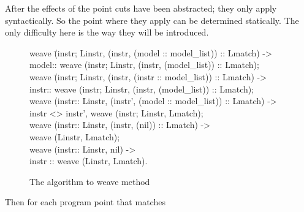 
After the effects of the point cuts have been
 abstracted; they only apply syntactically. So the point where
they apply can be determined statically.
The only difficulty here is the way they will be introduced.


%
\begin{figure}
\bcode
weave \=(instr; Linstr, (instr, (model :: model\_list)) :: Lmatch) -> \\
\>model:: weave (instr; Linstr, (instr, (model\_list)) :: Lmatch);\\
weave \=(instr; Linstr, (instr, (instr :: model\_list)) :: Lmatch) -> \\
\>instr:: weave (instr; Linstr, (instr, (model\_list)) :: Lmatch);\\
weave (instr:: Linstr, (instr', (model :: model\_list)) :: Lmatch) -> \\
\>instr <> instr',  weave (instr; Linstr, Lmatch);\\
weave (instr:: Linstr, (instr, (nil)) :: Lmatch) -> \\
\>weave (Linstr, Lmatch);\\
weave (instr:: Linstr, nil) -> \\
\>instr :: weave (Linstr, Lmatch).
\ecode
\caption{The algorithm to weave method}
\label{weaving_algo}
\end{figure}
Then for each program point that matches